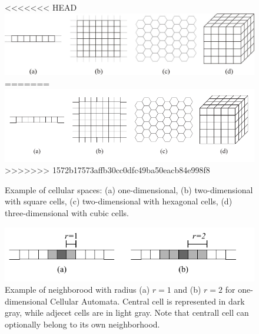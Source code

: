 \begin{figure}
  \begin{center}
<<<<<<< HEAD
    \includegraphics[width=12cm]{images/CellularAutomata/CellularSpaces}
=======
    \includegraphics[width=12cm]{./images/CellularAutomata/cellularspaces}
>>>>>>> 1572b17573affb30cc0dfc49ba50eacb84e998f8
    \caption{Example of cellular spaces: (a) one-dimensional, (b)
      two-dimensional with square cells, (c) two-dimensional with
      hexagonal cells, (d) three-dimensional with cubic cells.}
    \label{fig:cellularspaces}
  \end{center}
\end{figure}

\begin{figure}
  \begin{center}
    \includegraphics[width=12cm]{./images/CellularAutomata/onedimensional.pdf}
    \caption{Example of neighborood with radius (a) $r = 1$ and (b) $r
      = 2$ for one-dimensional Cellular Automata. Central cell is
      represented in dark gray, while adjecet cells are in light
      gray. Note that centrall cell can optionally belong to its own
      neighborhood.}
    \label{fig:1Dneighborhood}
  \end{center}
\end{figure}

